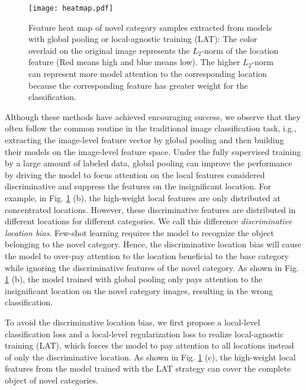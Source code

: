 \documentclass{article}
\begin{document}
\begin{figure}[t]
	\begin{center}
\texttt{[image: heatmap.pdf]}
	\end{center}
	\vspace{-15pt}
	\caption{Feature heat map of novel category samples extracted from models with global pooling or local-agnostic training (LAT): The color overlaid on the original image represents the $L_2$-norm of the location feature (Red means high and blue means low). The higher $L_2$-norm can represent more model attention to the corresponding location because the corresponding feature has greater weight for the classification.}
	\label{fig: heatmap}
	\vspace{-10pt}
\end{figure}


Although these methods have achieved encouraging success, we observe that they often follow the common routine in the traditional image classification task, i.g., extracting the image-level feature vector by global pooling \cite{lin2013network} and then building their models on the image-level feature space. Under the fully supervised training by a large amount of labeled data, global pooling can improve the performance by driving the model to focus attention on the local features considered discriminative and suppress the features on the insignificant location. For example, in Fig. \ref{fig: heatmap} (b), the high-weight local features are only distributed at concentrated locations. However, these discriminative features are distributed in different locations for different categories. We call this difference \textit{discriminative location bias}. Few-shot learning requires the model to recognize the object belonging to the novel category. Hence, the discriminative location bias will cause the model to over-pay attention to the location beneficial to the base category while ignoring the discriminative features of the novel category. As shown in Fig. \ref{fig: heatmap} (b), the model trained with global pooling only pays attention to the insignificant location on the novel category images, resulting in the wrong classification.

 
To avoid the discriminative location bias, we first propose a local-level classification loss and a local-level regularization loss to realize local-agnostic training (LAT), which forces the model to pay attention to all locations instead of only the discriminative location. As shown in Fig. \ref{fig: heatmap} (c), the high-weight local features from the model trained with the LAT strategy can cover the complete object of novel categories.
\end{document}
